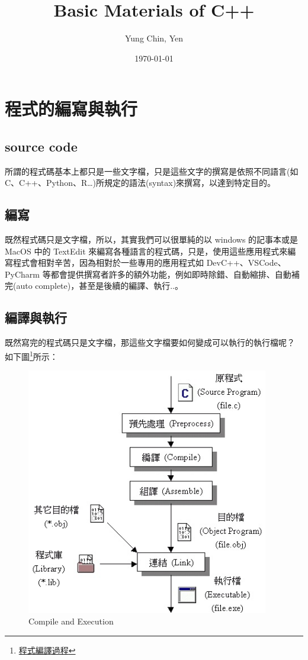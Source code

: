 \documentclass[12pt,a4paper]{article}
\author{Yung Chin, Yen}
\date{\today}
\title{Basic Materials of C++}
\begin{document}
\maketitle
\tableofcontents

\newpage

\section{程式的編寫與執行}
\label{cpp_execution}
\subsection{source code}
\label{sec:orgd318b72}
所謂的程式碼基本上都只是一些文字檔，只是這些文字的撰寫是依照不同語言(如 C、C++、Python、R\ldots{})所規定的語法(syntax)來撰寫，以達到特定目的。

\subsection{編寫}
\label{sec:org138a558}
既然程式碼只是文字檔，所以，其實我們可以很單純的以 windows 的記事本或是 MacOS 中的 TextEdit 來編寫各種語言的程式碼，只是，使用這些應用程式來編寫程式會相對辛苦，因為相對於一些專用的應用程式如 DevC++、VSCode、PyCharm 等都會提供撰寫者許多的額外功能，例如即時除錯、自動縮排、自動補完(auto complete)，甚至是後續的編譯、執行..。

\subsection{編譯與執行}
\label{sec:org6c3b6b3}
既然寫完的程式碼只是文字檔，那這些文字檔要如何變成可以執行的執行檔呢？
如下圖\footnote{\href{http://www2.lssh.tp.edu.tw/\~hlf/class-1/lang-c/compile.htm}{程式編譯過程}}所示：

\begin{figure}[htbp]
\centering
\includegraphics[width=400]{images/c_compile.jpg}
\caption{\label{fig:CNE}Compile and Execution}
\end{figure}
\end{document}

